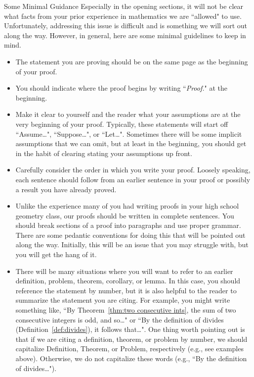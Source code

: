 \begin{section}{Some Minimal Guidance}\label{sec:minimal guidance}
Especially in the opening sections, it will not be clear what facts from your prior experience in mathematics we are ``allowed" to use.  Unfortunately, addressing this issue is difficult and is something we will sort out along the way.  However, in general, here are some minimal guidelines to keep in mind.

\begin{itemize}
\item The statement you are proving should be on the same page as the beginning of your proof.   
\item You should indicate where the proof begins by writing ``\emph{Proof.}" at the beginning.  
\item Make it clear to yourself and the reader what your assumptions are at the very beginning of your proof. Typically, these statements will start off ``Assume\ldots", ``Suppose\ldots", or ``Let\ldots".  Sometimes there will be some implicit assumptions that we can omit, but at least in the beginning, you should get in the habit of clearing stating your assumptions up front. 
\item Carefully consider the order in which you write your proof. Loosely speaking, each sentence should follow from an earlier sentence in your proof or possibly a result you have already proved.
\item Unlike the experience many of you had writing proofs in your high school geometry class, our proofs should be written in complete sentences.  You should break sections of a proof into paragraphs and use proper grammar.  There are some pedantic conventions for doing this that will be pointed out along the way.  Initially, this will be an issue that you may struggle with, but you will get the hang of it.
\item There will be many situations where you will want to refer to an earlier definition, problem, theorem, corollary, or lemma.  In this case, you should reference the statement by number, but it is also helpful to the reader to summarize the statement you are citing.  For example, you might write something like, ``By Theorem~\ref{thm:two consecutive ints}, the sum of two consecutive integers is odd, and so\ldots" or ``By the definition of divides (Definition~\ref{def:divides}), it follows that\ldots". One thing worth pointing out is that if we are citing a definition, theorem, or problem by number, we should capitalize Definition, Theorem, or Problem, respectively (e.g., see examples above). Otherwise, we do not capitalize these words (e.g., ``By the definition of divides\ldots").

\end{itemize}
\end{section}
